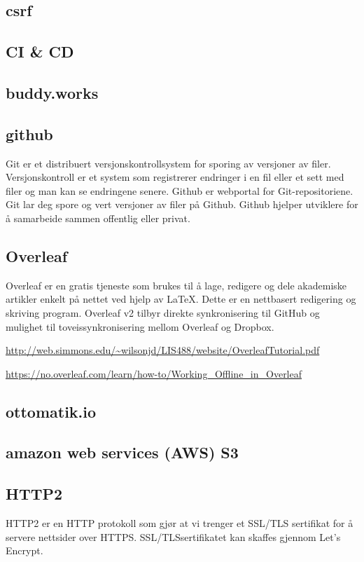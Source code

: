 \subsection{csrf}
\subsection{CI \& CD}
\subsection{buddy.works}

\subsection{github}
 Git er et distribuert versjonskontrollsystem for sporing av versjoner av filer. Versjonskontroll er et system som registrerer endringer i en fil eller et sett med filer og man kan se endringene senere. Github er webportal for Git-repositoriene. Git lar deg spore og vert versjoner av filer på Github. Github hjelper utviklere for å samarbeide sammen offentlig eller privat.
 
\subsection{Overleaf}
Overleaf er en gratis tjeneste som brukes til å lage, redigere og dele akademiske artikler enkelt på nettet ved hjelp av LaTeX. Dette er en nettbasert redigering og skriving program. 
Overleaf v2 tilbyr direkte synkronisering til GitHub og mulighet til toveissynkronisering mellom Overleaf og Dropbox.

\url{http://web.simmons.edu/~wilsonjd/LIS488/website/OverleafTutorial.pdf}

\url{https://no.overleaf.com/learn/how-to/Working_Offline_in_Overleaf}

\subsection{ottomatik.io}

\subsection{amazon web services (AWS) S3}

\subsection{HTTP2}
HTTP2 er en HTTP protokoll som gjør at vi trenger et SSL/TLS sertifikat for å servere nettsider over HTTPS. SSL/TLSsertifikatet kan skaffes gjennom Let’s Encrypt.  

